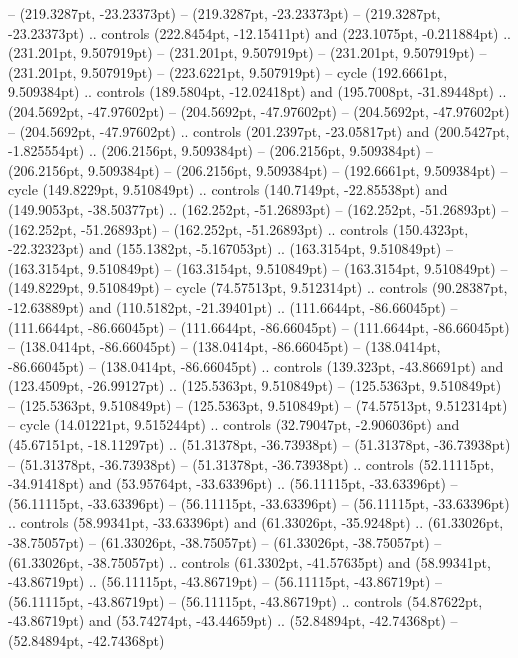  -- (219.3287pt, -23.23373pt)
 -- (219.3287pt, -23.23373pt)
 -- (219.3287pt, -23.23373pt) .. controls (222.8454pt, -12.15411pt) and (223.1075pt, -0.211884pt) .. (231.201pt, 9.507919pt)
 -- (231.201pt, 9.507919pt)
 -- (231.201pt, 9.507919pt)
 -- (231.201pt, 9.507919pt)
 -- (223.6221pt, 9.507919pt) -- cycle
(192.6661pt, 9.509384pt) .. controls (189.5804pt, -12.02418pt) and (195.7008pt, -31.89448pt) .. (204.5692pt, -47.97602pt)
 -- (204.5692pt, -47.97602pt)
 -- (204.5692pt, -47.97602pt)
 -- (204.5692pt, -47.97602pt) .. controls (201.2397pt, -23.05817pt) and (200.5427pt, -1.825554pt) .. (206.2156pt, 9.509384pt)
 -- (206.2156pt, 9.509384pt)
 -- (206.2156pt, 9.509384pt)
 -- (206.2156pt, 9.509384pt)
 -- (192.6661pt, 9.509384pt) -- cycle
(149.8229pt, 9.510849pt) .. controls (140.7149pt, -22.85538pt) and (149.9053pt, -38.50377pt) .. (162.252pt, -51.26893pt)
 -- (162.252pt, -51.26893pt)
 -- (162.252pt, -51.26893pt)
 -- (162.252pt, -51.26893pt) .. controls (150.4323pt, -22.32323pt) and (155.1382pt, -5.167053pt) .. (163.3154pt, 9.510849pt)
 -- (163.3154pt, 9.510849pt)
 -- (163.3154pt, 9.510849pt)
 -- (163.3154pt, 9.510849pt)
 -- (149.8229pt, 9.510849pt) -- cycle
(74.57513pt, 9.512314pt) .. controls (90.28387pt, -12.63889pt) and (110.5182pt, -21.39401pt) .. (111.6644pt, -86.66045pt)
 -- (111.6644pt, -86.66045pt)
 -- (111.6644pt, -86.66045pt)
 -- (111.6644pt, -86.66045pt)
 -- (138.0414pt, -86.66045pt)
 -- (138.0414pt, -86.66045pt)
 -- (138.0414pt, -86.66045pt)
 -- (138.0414pt, -86.66045pt) .. controls (139.323pt, -43.86691pt) and (123.4509pt, -26.99127pt) .. (125.5363pt, 9.510849pt)
 -- (125.5363pt, 9.510849pt)
 -- (125.5363pt, 9.510849pt)
 -- (125.5363pt, 9.510849pt)
 -- (74.57513pt, 9.512314pt) -- cycle
(14.01221pt, 9.515244pt) .. controls (32.79047pt, -2.906036pt) and (45.67151pt, -18.11297pt) .. (51.31378pt, -36.73938pt)
 -- (51.31378pt, -36.73938pt)
 -- (51.31378pt, -36.73938pt)
 -- (51.31378pt, -36.73938pt) .. controls (52.11115pt, -34.91418pt) and (53.95764pt, -33.63396pt) .. (56.11115pt, -33.63396pt)
 -- (56.11115pt, -33.63396pt)
 -- (56.11115pt, -33.63396pt)
 -- (56.11115pt, -33.63396pt) .. controls (58.99341pt, -33.63396pt) and (61.33026pt, -35.9248pt) .. (61.33026pt, -38.75057pt)
 -- (61.33026pt, -38.75057pt)
 -- (61.33026pt, -38.75057pt)
 -- (61.33026pt, -38.75057pt) .. controls (61.3302pt, -41.57635pt) and (58.99341pt, -43.86719pt) .. (56.11115pt, -43.86719pt)
 -- (56.11115pt, -43.86719pt)
 -- (56.11115pt, -43.86719pt)
 -- (56.11115pt, -43.86719pt) .. controls (54.87622pt, -43.86719pt) and (53.74274pt, -43.44659pt) .. (52.84894pt, -42.74368pt)
 -- (52.84894pt, -42.74368pt)
